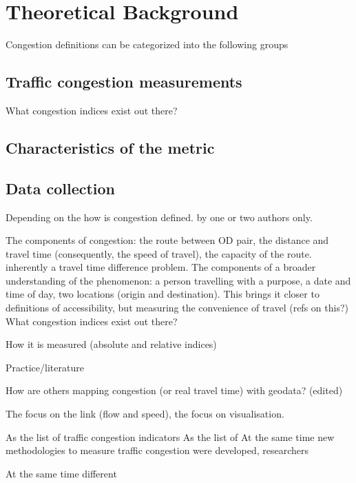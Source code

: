 \documentclass[a4paper]{jpconf}
\begin{document}
\section{Theoretical Background} %
\indent Congestion definitions can be categorized into the following groups
\subsection{Traffic congestion measurements}
\indent What congestion indices exist out there? 


\subsection{Characteristics of the metric}
\indent 


\subsection{Data collection}


\indent Depending on the 
how is congestion defined. by one or two authors only.


The components of congestion: the route between OD pair, the distance and travel time (consequently, the speed of travel), the capacity of the route. inherently a travel time difference problem.
The components of a broader understanding of the phenomenon: a person travelling with a purpose, a date and time of day, two locations (origin and destination). This brings it closer to definitions of accessibility, but measuring the convenience of travel (refs on this?)
\indent What congestion indices exist out there? \par
How it is measured (absolute and relative indices)

\indent Practice/literature\par


\indent How are others mapping congestion (or real travel time) with geodata? (edited) \par
The focus on the link (flow and speed), the focus on visualisation.





\indent As the list of traffic congestion indicators
As the list of 
At the same time new methodologies to measure traffic congestion were developed, researchers 


At the same time different 
\end{document}
